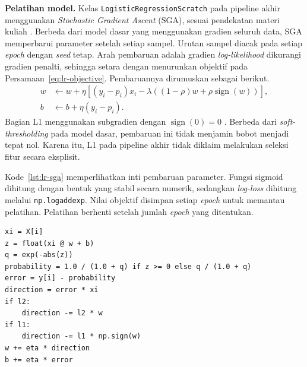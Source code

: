 \textbf{Pelatihan model.}
Kelas \texttt{LogisticRegressionScratch} pada pipeline akhir menggunakan \textit{Stochastic Gradient Ascent} (SGA), sesuai pendekatan materi kuliah \cite{khodra2021sga}. Berbeda dari model dasar yang menggunakan gradien seluruh data, SGA memperbarui parameter setelah setiap sampel. Urutan sampel diacak pada setiap \textit{epoch} dengan \textit{seed} tetap. Arah pembaruan adalah gradien \textit{log-likelihood} dikurangi gradien penalti, sehingga setara dengan menurunkan objektif pada Persamaan~\ref{eq:lr-objective}. Pembaruannya dirumuskan sebagai berikut.
\begin{align}
    w & \leftarrow w+\eta\left[(y_i-p_i)x_i-\lambda\left((1-\rho)w+\rho\operatorname{sign}(w)\right)\right], \\
    b & \leftarrow b+\eta(y_i-p_i).
\end{align}
Bagian L1 menggunakan subgradien dengan $\operatorname{sign}(0)=0$ \cite{boyd2003subgradient}. Berbeda dari \textit{soft-thresholding} pada model dasar, pembaruan ini tidak menjamin bobot menjadi tepat nol. Karena itu, L1 pada pipeline akhir tidak diklaim melakukan seleksi fitur secara eksplisit.

Kode~\ref{lst:lr-sga} memperlihatkan inti pembaruan parameter. Fungsi sigmoid dihitung dengan bentuk yang stabil secara numerik, sedangkan \textit{log-loss} dihitung melalui \texttt{np.logaddexp}. Nilai objektif disimpan setiap \textit{epoch} untuk memantau pelatihan. Pelatihan berhenti setelah jumlah \textit{epoch} yang ditentukan.

\begin{lstlisting}[float=htbp,caption={Pembaruan bobot dan bias per sampel pada pipeline akhir LR.},label={lst:lr-sga}]
xi = X[i]
z = float(xi @ w + b)
q = exp(-abs(z))
probability = 1.0 / (1.0 + q) if z >= 0 else q / (1.0 + q)
error = y[i] - probability
direction = error * xi
if l2:
    direction -= l2 * w
if l1:
    direction -= l1 * np.sign(w)
w += eta * direction
b += eta * error
\end{lstlisting}

